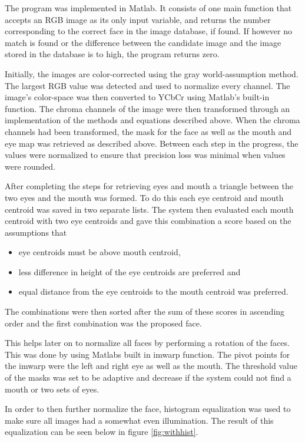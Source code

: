 The program was implemented in Matlab. It consists of one main function that accepts an RGB image as its only input variable, and returns the number corresponding to the correct face in the image database, if found. If however no match is found or the difference between the candidate image and the image stored in the database is to high, the program returns zero.

Initially, the images are color-corrected using the gray world-assumption method. The largest RGB value was detected and used to normalize every channel. The image’s color-space was then converted to YCbCr using Matlab’s built-in function. The chroma channels of the image were then transformed through an implementation of the methods and equations described above. When the chroma channels had been transformed, the mask for the face as well as the mouth and eye map was retrieved as described above. Between each step in the progress, the values were normalized to ensure that precision loss was minimal when values were rounded.

After completing the steps for retrieving eyes and mouth a triangle between the two eyes and the mouth was formed. To do this each eye centroid and mouth centroid was saved in two separate lists. The system then evaluated each mouth centroid with two eye centroids and gave this combination a score based on the assumptions that

\begin{itemize}
  \item eye centroids must be above mouth centroid,
  \item less difference in height of the eye centroids are preferred and
  \item equal distance from the eye centroids to the mouth centroid was preferred.
\end{itemize}

The combinations were then sorted after the sum of these scores in ascending order and the first combination was the proposed face. 

This helps later on to normalize all faces by performing a rotation of the faces. This was done by using Matlabs built in imwarp function. The pivot points for the imwarp were the left and right eye as well as the mouth. The threshold value of the masks was set to be adaptive and decrease if the system could not find a mouth or two sets of eyes.

In order to then further normalize the face, histogram equalization was used to make sure all images had a somewhat even illumination. The result of this equalization can be seen below in figure \ref{fig:withhist}.


